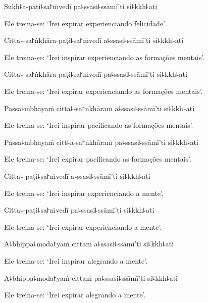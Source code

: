 Sukh꜕a-paṭi꜕sa꜓ṁvedī pa꜕ssasi꜕ssāmī'ti si꜕kkh꜕ati

\begin{english}
  Ele treina-se: `Irei expirar experienciando felicidade'.
\end{english}

Citta꜕-sa꜓ṅkhāra-paṭi꜕sa꜓ṁvedī a꜕ssasi꜕ssāmī'ti si꜕kkh꜕ati

\begin{english}
  Ele treina-se: `Irei inspirar experienciando as formações mentais'.
\end{english}

Citta꜕-sa꜓ṅkhāra-paṭi꜕sa꜓ṁvedī pa꜕ssasi꜕ssāmī'ti si꜕kkh꜕ati

\begin{english}
  Ele treina-se: `Irei expirar experienciando as formações mentais'.
\end{english}

Passa꜕mbhayaṁ citta꜕-sa꜓ṅkhāraṁ a꜕ssasi꜕ssāmī'ti si꜕kkh꜕ati

\begin{english}
  Ele treina-se: `Irei inspirar pacificando as formações mentais'.
\end{english}

Passa꜕mbhayaṁ citt꜕a-sa꜓ṅkhāraṁ pa꜕ssasi꜕ssāmī'ti si꜕kkh꜕ati

\begin{english}
  Ele treina-se: `Irei expirar pacificando as formações mentais'.
\end{english}

Citta꜕-paṭi꜕sa꜓ṁvedī a꜕ssasi꜕ssāmī'ti si꜕kkh꜕ati

\begin{english}
  Ele treina-se: `Irei inspirar experienciando a mente'.
\end{english}

Citta꜕-paṭi꜕sa꜓ṁvedī pa꜕ssasi꜕ssāmī'ti si꜕kkh꜕ati

\begin{english}
  Ele treina-se: `Irei expirar experienciando a mente'.
\end{english}

A꜕bhippa꜕moda꜓yaṁ cittaṁ a꜕ssasi꜕ssāmī'ti si꜕kkh꜕ati

\begin{english}
  Ele treina-se: `Irei inspirar alegrando a mente'.
\end{english}

A꜕bhippa꜕moda꜓yaṁ cittaṁ pa꜕ssasi꜕ssāmī'ti si꜕kkh꜕ati

\begin{english}
  Ele treina-se: `Irei expirar alegrando a mente'.
\end{english}

